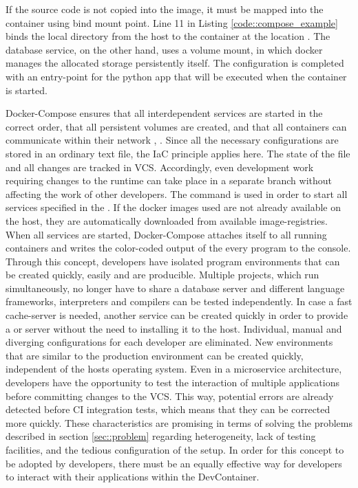         If the source code is not copied into the image, it must be mapped into the container using bind mount point. Line 11 in Listing \ref{code::compose_example} binds the local  directory from the host to the container at the location . The database service, on the other hand, uses a volume mount, in which docker manages the allocated storage persistently itself. The configuration is completed with an entry-point for the python app that will be executed when the container is started.\newline
        
        Docker-Compose ensures that all interdependent services are started in the correct order, that all persistent volumes are created, and that all containers can communicate within their network \cite{docker2020}, \cite{dockerdocs}. Since all the necessary configurations are stored in an ordinary text file, the \ac{IaC} principle applies here. The state of the  file and all changes are tracked in \ac{VCS}. Accordingly, even development work requiring changes to the runtime can take place in a separate branch without affecting the work of other developers.\newline
        The command  is used in order to start all services specified in the . If the docker images used are not already available on the host, they are automatically downloaded from available image-registries. When all services are started, Docker-Compose attaches itself to all running containers and writes the color-coded output of the every program to the console.\newline
        Through this concept, developers have isolated program environments that can be created quickly, easily and are producible. Multiple projects, which run simultaneously, no longer have to share a database server and different language frameworks, interpreters and compilers can be tested independently. In case a fast cache-server is needed, another service can be created quickly in order to provide a  or  server without the need to installing it to the host. Individual, manual and diverging configurations for each developer are eliminated. New environments that are similar to the production environment can be created quickly, independent of the hosts operating system. Even in a microservice architecture, developers have the opportunity to test the interaction of multiple applications before committing changes to the \ac{VCS}. This way, potential errors are already detected before \ac{CI} integration tests, which means that they can be corrected more quickly. These characteristics are promising in terms of solving the problems described in section \ref{sec::problem} regarding heterogeneity, lack of testing facilities, and the tedious configuration of the setup. In order for this concept to be adopted by developers, there must be an equally effective way for developers to interact with their applications within the DevContainer.

